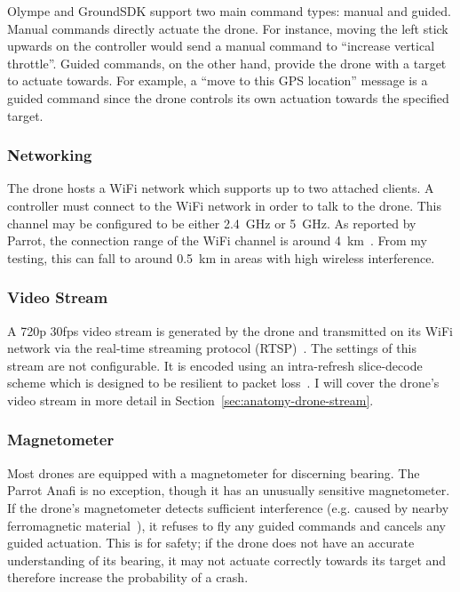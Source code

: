 Olympe and GroundSDK support two main command types: manual and guided. Manual commands directly actuate the drone. For instance, moving the left stick upwards on the controller would send a manual command to ``increase vertical throttle''. Guided commands, on the other hand, provide the drone with a target to actuate towards. For example, a ``move to this GPS location'' message is a guided command since the drone controls its own actuation towards the specified target.

\subsubsection{Networking}
The drone hosts a WiFi network which supports up to two attached clients. A controller must connect to the WiFi network in order to talk to the drone. This channel may be configured to be either 2.4~GHz or 5~GHz. As reported by Parrot, the connection range of the WiFi channel is around 4~km~\cite{ParrotAnafi}. From my testing, this can fall to around 0.5~km in areas with high wireless interference.

\subsubsection{Video Stream}
A 720p 30fps video stream is generated by the drone and transmitted on its WiFi network via the real-time streaming protocol (RTSP)~\cite{RTSP}. The settings of this stream are not configurable. It is encoded using an intra-refresh slice-decode scheme which is designed to be resilient to packet loss~\cite{Cloudinary}. I will cover the drone's video stream in more detail in Section~\ref{sec:anatomy-drone-stream}.

\subsubsection{Magnetometer}
Most drones are equipped with a magnetometer for discerning bearing. The Parrot Anafi is no exception, though it has an unusually sensitive magnetometer. If the drone's magnetometer detects sufficient interference (e.g. caused by nearby ferromagnetic material~\cite{Ardupilot}), it refuses to fly any guided commands and cancels any guided actuation. This is for safety; if the drone does not have an accurate understanding of its bearing, it may not actuate correctly towards its target and therefore increase the probability of a crash.

